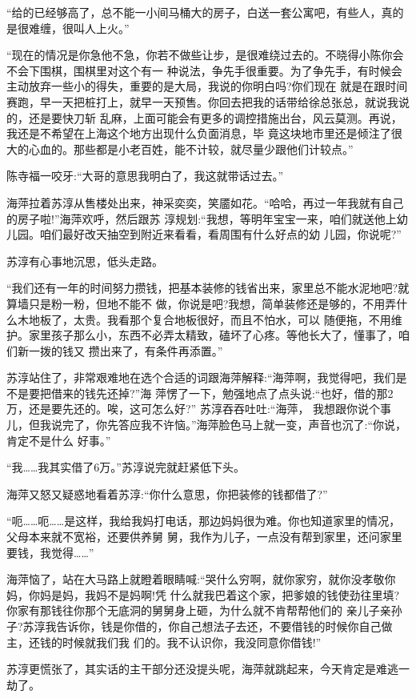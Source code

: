 \documentclass[11pt,a4paper,onecolumn]{article}
\begin{document}
``给的已经够高了，总不能一小间马桶大的房子，白送一套公寓吧，有些人，真的是很难缠，很叫人上火。''

``现在的情况是你急他不急，你若不做些让步，是很难绕过去的。不晓得小陈你会不会下围棋，围棋里对这个有一
种说法，争先手很重要。为了争先手，有时候会主动放弃一些小的得失，重要的是大局，我说的你明白吗?你们现在
就是在跟时间赛跑，早一天把桩打上，就早一天预售。你回去把我的话带给徐总张总，就说我说的，还是要快刀斩
乱麻，上面可能会有更多的调控措施出台，风云莫测。再说，我还是不希望在上海这个地方出现什么负面消息，毕
竟这块地市里还是倾注了很大的心血的。那些都是小老百姓，能不计较，就尽量少跟他们计较点。''

陈寺福一咬牙:``大哥的意思我明白了，我这就带话过去。''

海萍拉着苏淳从售楼处出来，神采奕奕，笑靥如花。``哈哈，再过一年我就有自己的房子啦!''海萍欢呼，然后跟苏
淳规划:``我想，等明年宝宝一来，咱们就送他上幼儿园。咱们最好改天抽空到附近来看看，看周围有什么好点的幼
儿园，你说呢?''

苏淳有心事地沉思，低头走路。

``我们还有一年的时间努力攒钱，把基本装修的钱省出来，家里总不能水泥地吧?就算墙只是粉一粉，但地不能不
做，你说是吧?我想，简单装修还是够的，不用弄什么木地板了，太贵。我看那个复合地板很好，而且不怕水，可以
随便拖，不用维护。家里孩子那么小，东西不必弄太精致，磕坏了心疼。等他长大了，懂事了，咱们新一拨的钱又
攒出来了，有条件再添置。''

苏淳站住了，非常艰难地在选个合适的词跟海萍解释:``海萍啊，我觉得吧，我们是不是要把借来的钱先还掉?''海
萍愣了一下，勉强地点了点头说:``也好，借的那2万，还是要先还的。唉，这可怎么好?'' 苏淳吞吞吐吐:``海萍，
我想跟你说个事儿，但我说完了，你先答应我不许恼。''海萍脸色马上就一变，声音也沉了:``你说，肯定不是什么
好事。''

``我……我其实借了6万。''苏淳说完就赶紧低下头。

海萍又怒又疑惑地看着苏淳:``你什么意思，你把装修的钱都借了?''

``呃……呃……是这样，我给我妈打电话，那边妈妈很为难。你也知道家里的情况，父母本来就不宽裕，还要供养舅
舅，我作为儿子，一点没有帮到家里，还问家里要钱，我觉得……''

海萍恼了，站在大马路上就瞪着眼睛喊:``哭什么穷啊，就你家穷，就你没孝敬你妈，你妈是妈，我妈不是妈啊!凭
什么就我巴着这个家，把爹娘的钱使劲往里填?你家有那钱往你那个无底洞的舅舅身上砸，为什么就不肯帮帮他们的
亲儿子亲孙子?苏淳我告诉你，钱是你借的，你自己想法子去还，不要借钱的时候你自己做主，还钱的时候就我们我
们的。我不认识你，我没同意你借钱!''

苏淳更慌张了，其实话的主干部分还没提头呢，海萍就跳起来，今天肯定是难逃一劫了。
\end{document}
